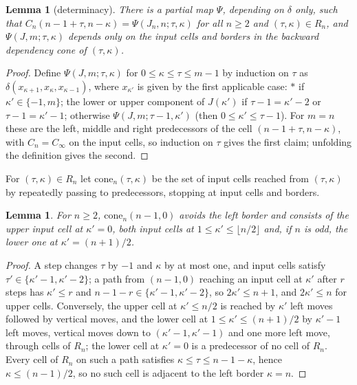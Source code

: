 \documentclass[3p]{elsarticle}
\newtheorem{lemma}[theorem]{Lemma}
\theoremstyle{remark}
\begin{document}
\begin{lemma}[determinacy]\label{lem:determinacy}
There is a partial map $\Psi$, depending on $\delta$ only, such that
$C_n(n-1+\tau,n-\kappa)=\Psi(J_n,n;\tau,\kappa)$ for all $n\ge2$ and
$(\tau,\kappa)\in R_n$, and $\Psi(J,m;\tau,\kappa)$ depends only on the input
cells and borders in the backward dependency cone of $(\tau,\kappa)$.
\end{lemma}

\begin{proof}
Define $\Psi(J,m;\tau,\kappa)$ for $0\le\kappa\le\tau\le m-1$ by induction on
$\tau$ as $\delta(x_{\kappa+1},x_\kappa,x_{\kappa-1})$, where $x_{\kappa'}$ is
given by the first applicable case: $\ast$ if $\kappa'\in\{-1,m\}$; the lower or
upper component of $J(\kappa')$ if $\tau-1=\kappa'-2$ or $\tau-1=\kappa'-1$;
otherwise $\Psi(J,m;\tau-1,\kappa')$ (then $0\le\kappa'\le\tau-1$). For $m=n$
these are the left, middle and right predecessors of the cell
$(n-1+\tau,n-\kappa)$, with $C_n=C_\infty$ on the input cells, so induction on
$\tau$ gives the first claim; unfolding the definition gives the second.
\end{proof}

For $(\tau,\kappa)\in R_n$ let $\mathrm{cone}_n(\tau,\kappa)$ be the set of
input cells reached from $(\tau,\kappa)$ by repeatedly passing to
predecessors, stopping at input cells and borders.

\begin{lemma}\label{lem:cone}
For $n\ge2$, $\mathrm{cone}_n(n-1,0)$ avoids the left border and consists of
the upper input cell at $\kappa'=0$, both input cells at
$1\le\kappa'\le\lfloor n/2\rfloor$ and, if $n$ is odd, the lower one at
$\kappa'=(n+1)/2$.
\end{lemma}

\begin{proof}
A step changes $\tau$ by $-1$ and $\kappa$ by at most one, and input cells
satisfy $\tau'\in\{\kappa'-1,\kappa'-2\}$; a path from $(n-1,0)$ reaching an
input cell at $\kappa'$ after $r$ steps has $\kappa'\le r$ and
$n-1-r\in\{\kappa'-1,\kappa'-2\}$, so $2\kappa'\le n+1$, and $2\kappa'\le n$ for
upper cells. Conversely, the upper cell at $\kappa'\le n/2$ is reached by
$\kappa'$ left moves followed by vertical moves, and the lower cell at
$1\le\kappa'\le(n+1)/2$ by $\kappa'-1$ left moves, vertical moves down to
$(\kappa'-1,\kappa'-1)$ and one more left move, through cells of $R_n$; the
lower cell at $\kappa'=0$ is a predecessor of no cell of $R_n$. Every cell of
$R_n$ on such a path satisfies $\kappa\le\tau\le n-1-\kappa$, hence
$\kappa\le(n-1)/2$, so no such cell is adjacent to the left border $\kappa=n$.
\end{proof}
\end{document}
